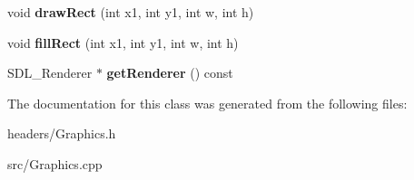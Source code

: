 \begin{DoxyCompactItemize}
\item 
\hypertarget{class_graphics_a74068ed7014bd8c965a71d8e1f9df9ca}{}\label{class_graphics_a74068ed7014bd8c965a71d8e1f9df9ca} 
void {\bfseries draw\+Rect} (int x1, int y1, int w, int h)
\item 
\hypertarget{class_graphics_ae874aa5745030706ca3813051280fe52}{}\label{class_graphics_ae874aa5745030706ca3813051280fe52} 
void {\bfseries fill\+Rect} (int x1, int y1, int w, int h)
\item 
\hypertarget{class_graphics_ab4399392db97b56a59a57bc357f1de48}{}\label{class_graphics_ab4399392db97b56a59a57bc357f1de48} 
S\+D\+L\+\_\+\+Renderer $\ast$ {\bfseries get\+Renderer} () const
\end{DoxyCompactItemize}


The documentation for this class was generated from the following files\+:\begin{DoxyCompactItemize}
\item 
headers/Graphics.\+h\item 
src/Graphics.\+cpp\end{DoxyCompactItemize}
